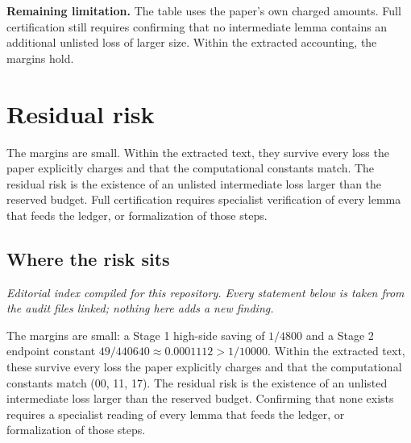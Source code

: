 \documentclass[11pt]{article}
\begin{document}
\textbf{Remaining limitation.} The table uses the paper's own charged amounts. Full certification still requires confirming that no intermediate lemma contains an additional unlisted loss of larger size. Within the extracted accounting, the margins hold.

\section{Residual risk}
The margins are small. Within the extracted text, they survive every loss the paper explicitly charges and that the computational constants match. The residual risk is the existence of an unlisted intermediate loss larger than the reserved budget. Full certification requires specialist verification of every lemma that feeds the ledger, or formalization of those steps.

\subsection*{Where the risk sits}
\emph{Editorial index compiled for this repository. Every statement below is taken from the audit files linked; nothing here adds a new finding.}

The margins are small: a Stage 1 high-side saving of $1/4800$ and a Stage 2 endpoint constant $49/440640\approx0.0001112>1/10000$. Within the extracted text, these survive every loss the paper explicitly charges and that the computational constants match (00, 11, 17). The residual risk is the existence of an unlisted intermediate loss larger than the reserved budget. Confirming that none exists requires a specialist reading of every lemma that feeds the ledger, or formalization of those steps.
\end{document}
